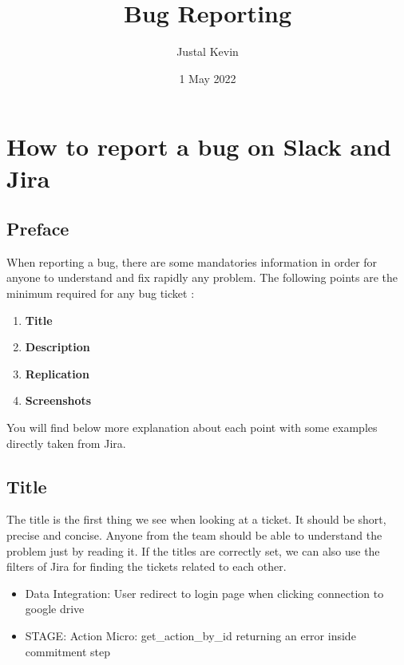 \documentclass[a4paper,article,oneside]{memoir}
\title{\textbf{Bug Reporting}}
\author{Justal Kevin}
\date{1 May 2022}
\begin{document}
\maketitle
\thispagestyle{empty}
\renewcommand{\contentsname}{Table of contents}
\tableofcontents*
\part{How to report a bug on Slack and Jira}
	\chapter*{Preface}
		When reporting a bug, there are some mandatories information in order for anyone to understand and fix rapidly any problem. The following points are the minimum required for any bug ticket :
	
        \begin{enumerate}
  			\item {\color{BrickRed}\textbf{Title}}
  			\item {\color{BrickRed}\textbf{Description}}
  			\item {\color{BrickRed}\textbf{Replication}}
  			\item {\color{BrickRed}\textbf{Screenshots}}
		\end{enumerate}
		
	You will find below more explanation about each point with some examples directly taken from Jira.
		\chapter{Title}
		The title is the first thing we see when looking at a ticket. It should be short, precise and concise. Anyone from the team should be able to understand the problem just by reading it. If the titles are correctly set, we can also use the filters of Jira for finding the tickets related to each other.
		
\noindent{}

\begin{itemize}
  \item Data Integration: User redirect to login page when clicking connection to google drive
  \item STAGE: Action Micro: get\_action\_by\_id returning an error inside commitment step
\end{itemize}
\end{document}
